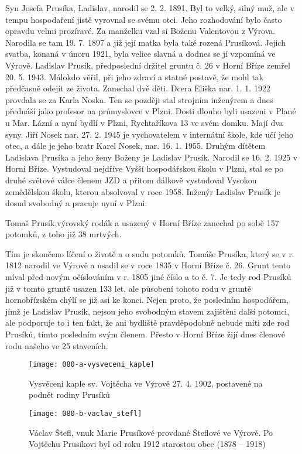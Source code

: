 \documentclass[../dejiny-rodu-prusiku.tex]{subfiles}
\begin{document}
Syn Josefa Prusíka, Ladislav, narodil se 2. 2. 1891. Byl to velký, silný muž, ale v tempu hospodaření jistě vyrovnal se svému otci. Jeho rozhodování bylo často opravdu velmi prozíravé. Za manželku vzal si Boženu Valentovou z Výrova. Narodila se tam 19. 7. 1897 a již její matka byla také rozená Prusíková. Jejich svatba, konaná v únoru 1921, byla velice slavná a dodnes se jí vzpomíná ve Výrově. Ladislav Prusík, předposlední držitel gruntu č. 26 v Horní Bříze zemřel 20. 5. 1943. Málokdo věřil, při jeho zdraví a statné postavě, že mohl tak předčasně odejít ze života. Zanechal dvě děti. Dcera Eliška nar. 1. 1. 1922 provdala se za Karla Noska. Ten se později stal strojním inženýrem a dnes přednáší jako profesor na průmyslovce v Plzni. Dosti dlouho byli usazeni v Plané u Mar. Lázní a nyní bydlí v Plzni, Rychtaříkova 13  ve svém domku. Mají dva syny. Jiří Nosek nar. 27. 2. 1945 je vychovatelem v internátní škole, kde učí jeho otec, a dále je jeho bratr Karel Nosek, nar. 16. 1. 1955. Druhým dítětem Ladislava Prusíka a jeho ženy Boženy je Ladislav Prusík. Narodil se 16. 2. 1925 v Horní Bříze. Vystudoval nejdříve Vyšší hospodářskou školu v Plzni, stal se po druhé světové válce členem JZD a přitom dálkově vystudoval Vysokou zemědělskou školu, kterou absolvoval v roce 1958. Inženýr Ladislav Prusík je dosud svobodný a pracuje nyní v Plzni.

Tomaš Prusík,výrovský rodák a usazený v Horní Bříze zanechal po sobě 157 potomků, z toho již 38 mrtvých.

Tím je skončeno líčení o životě a o sudu potomků. Tomáše Prusíka, který se v r. 1812 narodil ve Výrově a usadil se v roce 1835 v Horní Bříze č. 26. Grunt tento míval před novým očíslováním v r. 1805 jiné číslo a to č. 7. Je­ tedy rod Prusíků již v tomto gruntě usazen 133 let, ale působení tohoto rodu v gruntě hornobřízském chýlí se již asi ke konci. Nejen proto, že posledním hospodářem, jímž je Ladislav Prusík, nejsou jeho svobodným stavem zajištěni další potomci, ale podporuje to i ten fakt, že ani bydliště pravděpodobně nebude míti zde rod Prusíků, tímto posledním svým členem. Přesto v Horní Bříze žijí dnes členové rodu našeho ve 25 staveních.

\begin{figure}
\centering
\texttt{[image: 080-a-vysveceni\_kaple]}
\caption{Vysvěceni kaple sv. Vojtěcha ve Výrově 27. 4. 1902, postavené na podnět rodiny Prusíků}
\label{fig:080-a-vysveceni_kaple}
\end{figure}

\begin{figure}
\centering
\texttt{[image: 080-b-vaclav\_stefl]}
\caption{Václav Štefl, vnuk Marie Prusíkové provdané Šteflové ve Výrově. Po Vojtěchu Prusíkovi byl od roku 1912 starostou obce (1878 – 1918)}
\label{fig:080-b-vaclav_stefl}
\end{figure}
\end{document}

